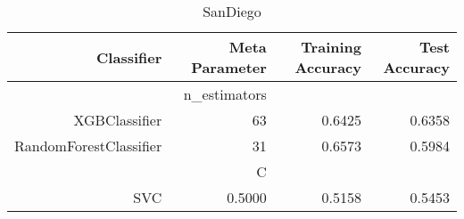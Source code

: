 
\begin{table}[H]
    \caption{SanDiego}
    \centering
    \begin{tabular}{|r|r|r|r|}
        \hline
        Classifier &Meta Parameter &Training Accuracy
        &Test Accuracy\\
        \hline
        &n\_estimators &\multicolumn{2}{|r|}{}\\
        \hline
        XGBClassifier &63 &0.6425 &0.6358\\
        \hline
        RandomForestClassifier &31 &0.6573 &0.5984\\
        \hline
        &C &\multicolumn{2}{|r|}{}\\
        \hline
        SVC &0.5000 &0.5158 &0.5453\\
        \hline
    \end{tabular}
\end{table}
